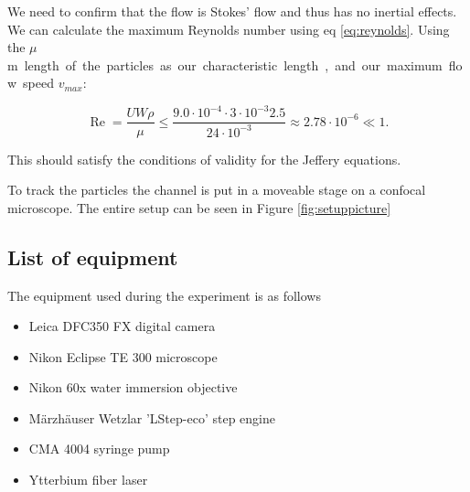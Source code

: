 \noindent We need to confirm that the flow is Stokes' flow and thus has no inertial effects. We can calculate the maximum Reynolds number using eq \ref{eq:reynolds}. Using the \unit[3]{$\mu$m} length of the particles as our characteristic length, and our maximum flow speed $v_{max}$:

\begin{equation}
\operatorname{Re} = \frac{U W \rho}{\mu} 
\leq \frac{9.0\cdot 10^{-4} \cdot 3 \cdot 10^{-3} 2.5 }{24 \cdot 10^{-3}} 
\approx	 2.78  \cdot 10^{-6} \ll 1.
\end{equation}

\noindent This should satisfy the conditions of validity for the Jeffery equations. 

To track the particles the channel is put in a moveable stage on a confocal microscope. The entire setup can be seen in Figure \ref{fig:setuppicture}



\subsection{List of equipment}
 The equipment used during the experiment is as follows
\begin{itemize}
\item Leica DFC350 FX digital camera 
\item Nikon Eclipse TE 300 microscope
\item Nikon 60x water immersion objective
\item Märzhäuser Wetzlar 'LStep-eco' step engine
\item CMA 4004 syringe pump
\item Ytterbium fiber laser  %
\end{itemize}

%
%
	